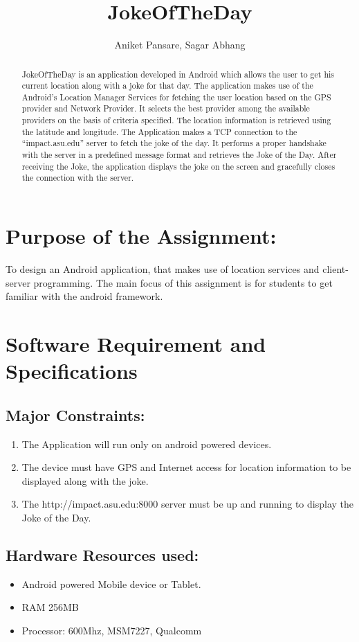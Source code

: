 \documentclass[11pt]{report}
\begin{document}
\title{JokeOfTheDay}
\author{Aniket Pansare, Sagar Abhang}
\maketitle
\begin{abstract}
JokeOfTheDay is an application developed in Android which allows the user to get his current location along with a joke for that day. The application makes use of the Android's Location Manager Services for fetching the user location based on the GPS provider and Network Provider. It selects the best provider among the available providers on the basis of criteria specified. The location information is retrieved using the latitude and longitude. The Application makes a TCP connection to the “impact.asu.edu” server to fetch the joke of the day. It performs a proper handshake with the server in a predefined message format and retrieves the Joke of the Day. After receiving the Joke, the application displays the joke on the screen and gracefully closes the connection with the server.
\end{abstract}
\tableofcontents
\newpage

\section{Purpose of the Assignment:}
To design an Android application, that makes use of location services and client-server programming. The main focus of this assignment is for students to get familiar with the android framework.

\section{Software Requirement and Specifications}
\subsection{Major Constraints:}
\begin{enumerate}
\item The Application will run only on android powered devices.
\item The device must have GPS and Internet access for location information to be displayed along with the joke.
\item The http://impact.asu.edu:8000 server must be up and running to display the Joke of the Day.
\end{enumerate}

\subsection{Hardware Resources used:}
\begin{itemize}
\item Android powered Mobile device or Tablet.
\item RAM 256MB
\item Processor: 600Mhz, MSM7227, Qualcomm
\end{itemize}
\end{document}
